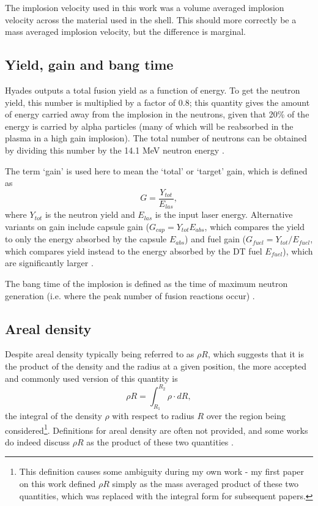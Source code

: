 The implosion velocity used in this work was a volume averaged implosion velocity across the material used in the shell. This should more correctly be a mass averaged implosion velocity, but the difference is marginal.

\subsection{Yield, gain and bang time}

Hyades outputs a total fusion yield as a function of energy. To get the neutron yield, this number is multiplied by a factor of 0.8; this quantity gives the amount of energy carried away from the implosion in the neutrons, given that 20\% of the energy is carried by alpha particles (many of which will be reabsorbed in the plasma in a high gain implosion). The total number of neutrons can be obtained by dividing this number by the 14.1 MeV neutron energy \cite{Atzeni2008}.

The term `gain' is used here to mean the `total' or `target' gain, which is defined as \begin{equation} G = \frac{Y_{tot}}{E_{las}}, \end{equation} where $Y_{tot}$ is the neutron yield and $E_{las}$ is the input laser energy. Alternative variants on gain include capsule gain ($G_{cap} = Y_{tot}E_{abs}$, which compares the yield to only the energy absorbed by the capsule $E_{abs}$) and fuel gain ($G_{fuel} = Y_{tot} / E_{fuel}$, which compares yield instead to the energy absorbed by the DT fuel $E_{fuel}$), which are significantly larger \cite{Atzeni2008, Abu-Shawareb2022}.

The bang time of the implosion is defined as the time of maximum neutron generation (i.e. where the peak number of fusion reactions occur) \cite{Craxton2015}.

\subsection{Areal density}

Despite areal density typically being referred to as $\rho R$, which suggests that it is the product of the density and the radius at a given position, the more accepted and commonly used version \cite{Craxton2005, Betti2005, Abu-Shawareb2022} of this quantity is \begin{equation} \rho R = \int_{R_1}^{R_2} \rho \cdot dR, \end{equation} the integral of the density $\rho$ with respect to radius $R$ over the region being considered\footnote{This definition causes some ambiguity during my own work - my first paper on this work defined $\rho R$ simply as the mass averaged product of these two quantities, which was replaced with the integral form for subsequent papers.}. Definitions for areal density are often not provided, and some works do indeed discuss $\rho R$ as the product of these two quantities \cite{Atzeni2008}.

